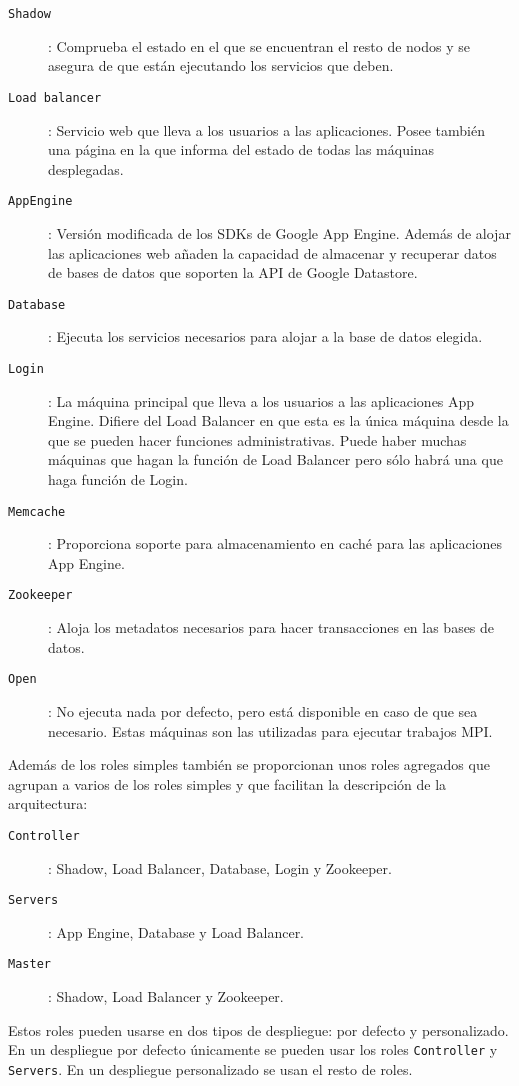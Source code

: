 \begin{description}
\item[\texttt{Shadow}]: Comprueba el estado en el que se encuentran el resto de nodos y se asegura de que están ejecutando los servicios que deben.
\item[\texttt{Load balancer}]: Servicio web que lleva a los usuarios a las aplicaciones. Posee también una página en la que informa del estado de todas las máquinas desplegadas.
\item[\texttt{AppEngine}]: Versión modificada de los SDKs de Google App Engine. Además de alojar las aplicaciones web añaden la capacidad de almacenar y recuperar datos de bases de datos que soporten la API de Google Datastore.
\item[\texttt{Database}]: Ejecuta los servicios necesarios para alojar a la base de datos elegida.
\item[\texttt{Login}]: La máquina principal que lleva a los usuarios a las aplicaciones App Engine. Difiere del Load Balancer en que esta es la única máquina desde la que se pueden hacer funciones administrativas. Puede haber muchas máquinas que hagan la función de Load Balancer pero sólo habrá una que haga función de Login.
\item[\texttt{Memcache}]: Proporciona soporte para almacenamiento en caché para las aplicaciones App Engine.
\item[\texttt{Zookeeper}]: Aloja los metadatos necesarios para hacer transacciones en las bases de datos.
\item[\texttt{Open}]: No ejecuta nada por defecto, pero está disponible en caso de que sea necesario. Estas máquinas son las utilizadas para ejecutar trabajos MPI.
\end{description}

Además de los roles simples también se proporcionan unos roles agregados que agrupan a varios de los roles simples y que facilitan la descripción de la arquitectura:

\begin{description}
\item[\texttt{Controller}]: Shadow, Load Balancer, Database, Login y Zookeeper.
\item[\texttt{Servers}]: App Engine, Database y Load Balancer.
\item[\texttt{Master}]: Shadow, Load Balancer y Zookeeper.
\end{description}

Estos roles pueden usarse en dos tipos de despliegue: por defecto y personalizado. En un despliegue por defecto únicamente se pueden usar los roles \texttt{Controller} y \texttt{Servers}. En un despliegue personalizado se usan el resto de roles.


